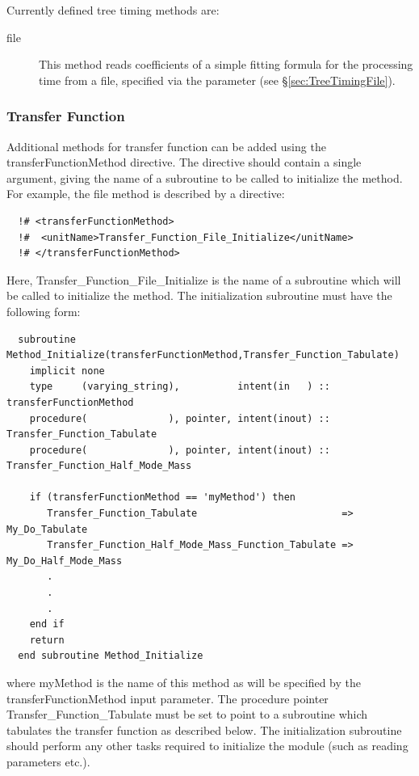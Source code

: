 Currently defined tree timing methods are:
\begin{description}
 \item [{\normalfont \ttfamily file}] This method reads coefficients of a simple fitting formula for the processing time from a file, specified via the {\normalfont \ttfamily [timePerTreeFitFileName]} parameter (see \S\ref{sec:TreeTimingFile}).
\end{description}

\subsubsection{Transfer Function}\label{sec:TransferFunctionMethod}

Additional methods for transfer function can be added using the {\normalfont \ttfamily transferFunctionMethod} directive. The directive should contain a single argument, giving the name of a subroutine to be called to initialize the method. For example, the {\normalfont \ttfamily file} method is described by a directive:
\begin{verbatim}
  !# <transferFunctionMethod>
  !#  <unitName>Transfer_Function_File_Initialize</unitName>
  !# </transferFunctionMethod>
\end{verbatim}
Here, {\normalfont \ttfamily Transfer\_Function\_File\_Initialize} is the name of a subroutine which will be called to initialize the method. The initialization subroutine must have the following form:
\begin{verbatim}
  subroutine Method_Initialize(transferFunctionMethod,Transfer_Function_Tabulate)
    implicit none
    type     (varying_string),          intent(in   ) :: transferFunctionMethod
    procedure(              ), pointer, intent(inout) :: Transfer_Function_Tabulate
    procedure(              ), pointer, intent(inout) :: Transfer_Function_Half_Mode_Mass

    if (transferFunctionMethod == 'myMethod') then
       Transfer_Function_Tabulate                         => My_Do_Tabulate
       Transfer_Function_Half_Mode_Mass_Function_Tabulate => My_Do_Half_Mode_Mass
       .
       .
       .
    end if
    return
  end subroutine Method_Initialize
\end{verbatim}
where {\normalfont \ttfamily myMethod} is the name of this method as will be specified by the {\normalfont \ttfamily transferFunctionMethod} input parameter. The procedure pointer {\normalfont \ttfamily Transfer\_Function\_Tabulate} must be set to point to a subroutine which tabulates the transfer function as described below. The initialization subroutine should perform any other tasks required to initialize the module (such as reading parameters etc.).

